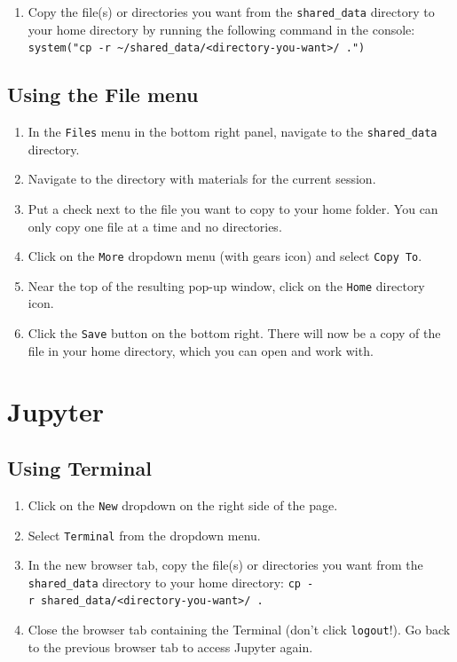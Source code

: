 \documentclass[]{book}
\providecommand{\tightlist}{%
  \setlength{\itemsep}{0pt}\setlength{\parskip}{0pt}}
\begin{document}
\begin{enumerate}
\def\labelenumi{\arabic{enumi}.}
\tightlist
\item
  Copy the file(s) or directories you want from the \texttt{shared\_data} directory to your home directory by running the following command in the console: \texttt{system("cp\ -r\ \textasciitilde{}/shared\_data/\textless{}directory-you-want\textgreater{}/\ .")}
\end{enumerate}

\hypertarget{using-the-file-menu}{%
\subsection{Using the File menu}\label{using-the-file-menu}}

\begin{enumerate}
\def\labelenumi{\arabic{enumi}.}
\tightlist
\item
  In the \texttt{Files} menu in the bottom right panel, navigate to the \texttt{shared\_data} directory.
\item
  Navigate to the directory with materials for the current session.
\item
  Put a check next to the file you want to copy to your home folder. You can only copy one file at a time and no directories.
\item
  Click on the \texttt{More} dropdown menu (with gears icon) and select \texttt{Copy\ To}.
\item
  Near the top of the resulting pop-up window, click on the \texttt{Home} directory icon.
\item
  Click the \texttt{Save} button on the bottom right. There will now be a copy of the file in your home directory, which you can open and work with.
\end{enumerate}

\hypertarget{jupyter-2}{%
\section{Jupyter}\label{jupyter-2}}

\hypertarget{using-terminal-1}{%
\subsection{Using Terminal}\label{using-terminal-1}}

\begin{enumerate}
\def\labelenumi{\arabic{enumi}.}
\tightlist
\item
  Click on the \texttt{New} dropdown on the right side of the page.
\item
  Select \texttt{Terminal} from the dropdown menu.
\item
  In the new browser tab, copy the file(s) or directories you want from the \texttt{shared\_data} directory to your home directory: \texttt{cp\ -r\ shared\_data/\textless{}directory-you-want\textgreater{}/\ .}
\item
  Close the browser tab containing the Terminal (don't click \texttt{logout}!). Go back to the previous browser tab to access Jupyter again.
\end{enumerate}
\end{document}
